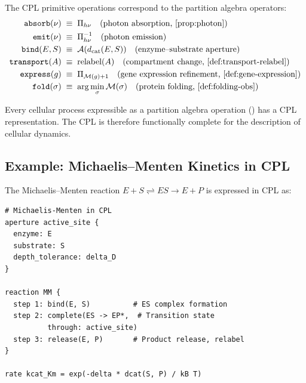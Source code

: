 \begin{definition}
\label{def:cpl-primitives}
The CPL primitive operations correspond to the partition algebra operators:
\begin{align*}
    \texttt{absorb}(\nu)  &\;\equiv\; \Pi_{h\nu} \quad
        \text{(photon absorption, \Cref{prop:photon})} \\
    \texttt{emit}(\nu)    &\;\equiv\; \Pi_{h\nu}^{-1} \quad
        \text{(photon emission)} \\
    \texttt{bind}(E, S)   &\;\equiv\; \mathcal{A}(\dcat(E,S)) \quad
        \text{(enzyme--substrate aperture)} \\
    \texttt{transport}(A) &\;\equiv\; \text{relabel}(A) \quad
        \text{(compartment change, \Cref{def:transport-relabel})} \\
    \texttt{express}(g)   &\;\equiv\; \Pi_{\Depth(g)+1} \quad
        \text{(gene expression refinement, \Cref{def:gene-expression})} \\
    \texttt{fold}(\sigma) &\;\equiv\; \arg\min_\sigma \Depth(\sigma) \quad
        \text{(protein folding, \Cref{def:folding-obs})}
\end{align*}
\end{definition}

\begin{proposition}
\label{prop:cpl-complete}
Every cellular process expressible as a partition algebra operation
() has a CPL representation.  The CPL is
therefore functionally complete for the description of cellular dynamics.
\end{proposition}

\subsection{Example: Michaelis--Menten Kinetics in CPL}

The Michaelis--Menten reaction $E + S \rightleftharpoons ES \to E + P$
is expressed in CPL as:

\begin{verbatim}
# Michaelis-Menten in CPL
aperture active_site {
  enzyme: E
  substrate: S
  depth_tolerance: delta_D
}

reaction MM {
  step 1: bind(E, S)          # ES complex formation
  step 2: complete(ES -> EP*,  # Transition state
          through: active_site)
  step 3: release(E, P)       # Product release, relabel
}

rate kcat_Km = exp(-delta * dcat(S, P) / kB T)
\end{verbatim}

